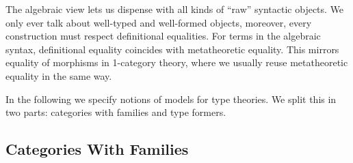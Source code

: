 \documentclass[12pt,a4paper,twoside,openany]{book}
\theoremstyle{remark}
\theoremstyle{definition}
\theoremstyle{theorem}
\begin{document}
The algebraic view lets us dispense with all kinds of ``raw'' syntactic objects.
We only ever talk about well-typed and well-formed objects, moreover, every
construction must respect definitional equalities. For terms in the algebraic
syntax, definitional equality coincides with metatheoretic equality. This
mirrors equality of morphisms in 1-category theory, where we usually reuse
metatheoretic equality in the same way.

In the following we specify notions of models for type theories. We split this
in two parts: categories with families and type formers.

\subsection{Categories With Families}
\end{document}
